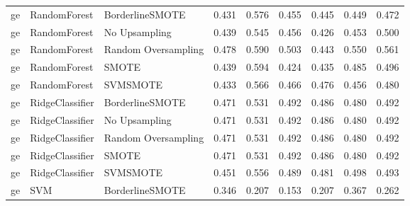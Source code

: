 \begin{tabular}{lllllllll}
      ge &                 RandomForest &     BorderlineSMOTE & 0.431 &                     0.576 &                 0.455 &                  0.445 &                                   0.449 &     0.472 \\
      ge &                 RandomForest &       No Upsampling & 0.439 &                     0.545 &                 0.456 &                  0.426 &                                   0.453 &     0.500 \\
      ge &                 RandomForest & Random Oversampling & 0.478 &                     0.590 &                 0.503 &                  0.443 &                                   0.550 &     0.561 \\
      ge &                 RandomForest &               SMOTE & 0.439 &                     0.594 &                 0.424 &                  0.435 &                                   0.485 &     0.496 \\
      ge &                 RandomForest &            SVMSMOTE & 0.433 &                     0.566 &                 0.466 &                  0.476 &                                   0.456 &     0.480 \\
      ge &              RidgeClassifier &     BorderlineSMOTE & 0.471 &                     0.531 &                 0.492 &                  0.486 &                                   0.480 &     0.492 \\
      ge &              RidgeClassifier &       No Upsampling & 0.471 &                     0.531 &                 0.492 &                  0.486 &                                   0.480 &     0.492 \\
      ge &              RidgeClassifier & Random Oversampling & 0.471 &                     0.531 &                 0.492 &                  0.486 &                                   0.480 &     0.492 \\
      ge &              RidgeClassifier &               SMOTE & 0.471 &                     0.531 &                 0.492 &                  0.486 &                                   0.480 &     0.492 \\
      ge &              RidgeClassifier &            SVMSMOTE & 0.451 &                     0.556 &                 0.489 &                  0.481 &                                   0.498 &     0.493 \\
      ge &                          SVM &     BorderlineSMOTE & 0.346 &                     0.207 &                 0.153 &                  0.207 &                                   0.367 &     0.262 \\

\end{tabular}
